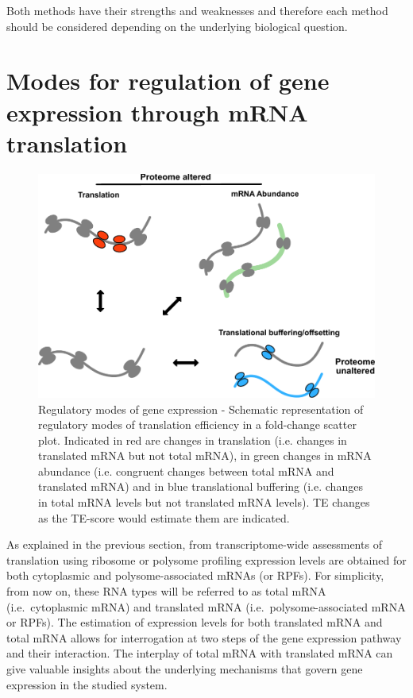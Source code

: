\documentclass[
  12pt,
  openany]{book}
\begin{document}
Both methods have their strengths and weaknesses and therefore each method should be considered depending on the underlying biological question.

\section{Modes for regulation of gene expression through mRNA translation} \label{modes}

\begin{figure}
  \includegraphics{./figures/geneModes_MRNA.pdf}
  \caption{Regulatory modes of gene expression - Schematic representation of regulatory modes of translation efficiency in a fold-change scatter plot. Indicated in red are changes in translation (i.e. changes in translated mRNA but not total mRNA), in green changes in mRNA abundance (i.e. congruent changes between total mRNA and translated mRNA) and in blue translational buffering (i.e. changes in total mRNA levels but not translated mRNA levels). TE changes as the TE-score would estimate them are indicated.\label{fig:modes}}
\end{figure}

As explained in the previous section, from transcriptome-wide assessments of translation using ribosome or polysome profiling expression levels are obtained for both cytoplasmic and polysome-associated mRNAs (or RPFs). For simplicity, from now on, these RNA types will be referred to as total mRNA (i.e.~cytoplasmic mRNA) and translated mRNA (i.e.~polysome-associated mRNA or RPFs). The estimation of expression levels for both translated mRNA and total mRNA allows for interrogation at two steps of the gene expression pathway and their interaction. The interplay of total mRNA with translated mRNA can give valuable insights about the underlying mechanisms that govern gene expression in the studied system.
\end{document}
